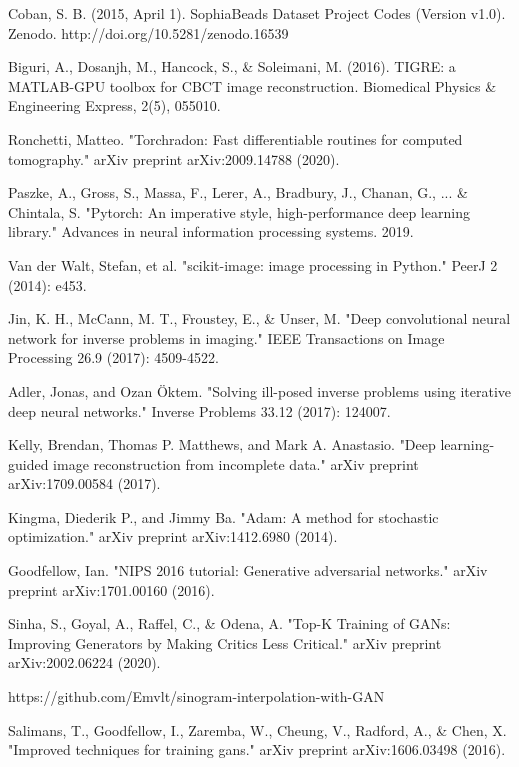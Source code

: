 \begin{thebibliography}{00}
Coban, S. B. (2015, April 1). SophiaBeads Dataset Project Codes (Version v1.0). Zenodo. http://doi.org/10.5281/zenodo.16539

 Biguri, A., Dosanjh, M., Hancock, S., \& Soleimani, M. (2016). TIGRE: a MATLAB-GPU toolbox for CBCT image reconstruction. Biomedical Physics \& Engineering Express, 2(5), 055010.

Ronchetti, Matteo. "Torchradon: Fast differentiable routines for computed tomography." arXiv preprint arXiv:2009.14788 (2020).

 Paszke, A., Gross, S., Massa, F., Lerer, A., Bradbury, J., Chanan, G., ... \& Chintala, S. "Pytorch: An imperative style, high-performance deep learning library." Advances in neural information processing systems. 2019.

 Van der Walt, Stefan, et al. "scikit-image: image processing in Python." PeerJ 2 (2014): e453.

Jin, K. H., McCann, M. T., Froustey, E., \& Unser, M. "Deep convolutional neural network for inverse problems in imaging." IEEE Transactions on Image Processing 26.9 (2017): 4509-4522.

Adler, Jonas, and Ozan Öktem. "Solving ill-posed inverse problems using iterative deep neural networks." Inverse Problems 33.12 (2017): 124007.

Kelly, Brendan, Thomas P. Matthews, and Mark A. Anastasio. "Deep learning-guided image reconstruction from incomplete data." arXiv preprint arXiv:1709.00584 (2017).

Kingma, Diederik P., and Jimmy Ba. "Adam: A method for stochastic optimization." arXiv preprint arXiv:1412.6980 (2014).

Goodfellow, Ian. "NIPS 2016 tutorial: Generative adversarial networks." arXiv preprint arXiv:1701.00160 (2016).

Sinha, S., Goyal, A., Raffel, C., \& Odena, A.  "Top-K Training of GANs: Improving Generators by Making Critics Less Critical." arXiv preprint arXiv:2002.06224 (2020).

 https://github.com/Emvlt/sinogram-interpolation-with-GAN

Salimans, T., Goodfellow, I., Zaremba, W., Cheung, V., Radford, A., \& Chen, X. "Improved techniques for training gans." arXiv preprint arXiv:1606.03498 (2016).

\end{thebibliography}